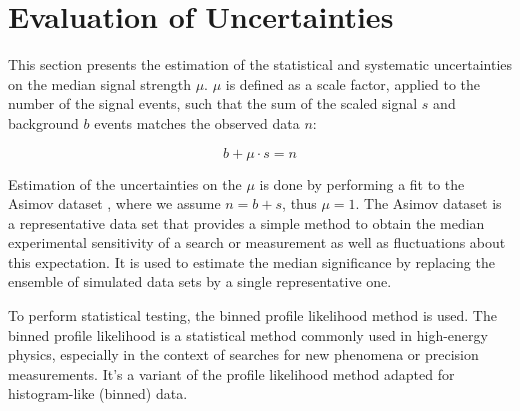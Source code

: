 \chapter{Evaluation of Uncertainties}
\label{ch:Evaluation}

This section presents the estimation of the statistical and systematic uncertainties on the median signal strength
$\mu$. $\mu$ is defined as a scale factor, applied to the number of the signal events, such that the sum of the scaled
signal $s$ and background $b$ events matches the observed data $n$:

\begin{equation}
    b + \mu \cdot s = n
\end{equation}


Estimation of the uncertainties on the $\mu$ is done by performing a fit to the Asimov dataset \cite{statistical}, where
we assume $n = b + s$, thus $\mu = 1$. The Asimov dataset is a representative data set that provides a
simple method to obtain the median experimental sensitivity of a search or measurement as well as fluctuations about
this expectation. It is used to estimate the median significance by replacing the ensemble of simulated data sets by a
single representative one.


To perform statistical testing, the binned profile likelihood method is used. The binned profile likelihood is a
statistical method commonly used in high-energy physics, especially in the context of searches for new phenomena or
precision measurements. It's a variant of the profile likelihood method adapted for histogram-like (binned) data.

